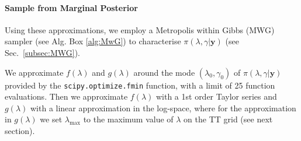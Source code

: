 \paragraph{Sample from Marginal Posterior}
Using these approximations, we employ a Metropolis within Gibbs (MWG) sampler (see Alg. Box \ref{alg:MwG}) to characterise $\pi(\lambda,\gamma|\bm{y})$ (see Sec.~\ref{subsec:MWG}).

We approximate $f(\lambda)$  and $g(\lambda)$ around the mode $( \lambda_{0}, \gamma_0 )$ of $\pi(\lambda,\gamma| \bm{y})$ provided by the \texttt{scipy.optimize.fmin} function, with a limit of 25 function evaluations.
Then we approximate $f(\lambda)$ with a 1st order Taylor series and $g(\lambda)$ with a linear approximation in the log-space, where for the approximation in $g(\lambda)$ we set $\lambda_{\text{max}}$ to the maximum value of $\lambda$ on the TT grid (see next section).

